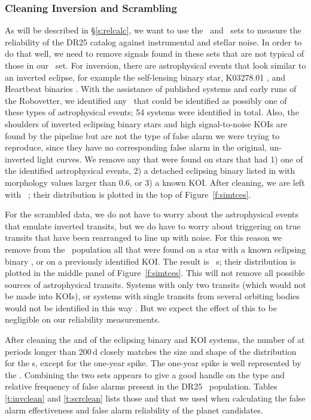 \subsubsection{Cleaning Inversion and Scrambling}
\label{s:clean}
As will be described in \S\ref{s:relcalc}, we want to use the \invtce\ and \scrtce\ sets to measure the reliability of the DR25 catalog against instrumental and stellar noise. In order to do that well, we need to remove signals found in these sets that are not typical of those in our \opstce\ set. For inversion, there are astrophysical events that look similar to an inverted eclipse, for example the self-lensing binary star, K03278.01 \citep{Kruse2014}, and Heartbeat binaries \citep{Thompson2012}. With the assistance of published systems and early runs of the Robovetter, we identified any \invtce\ that could be identified as possibly one of these types of astrophysical events; 54 systems were identified in total. Also, the shoulders of inverted eclipsing binary stars and high signal-to-noise KOIs are found by the pipeline but are not the type of false alarm we were trying to reproduce, since they have no corresponding false alarm in the original, un-inverted light curves. We remove any  that were found on stars that had 1) one of the identified astrophysical events, 2) a detached eclipsing binary listed in \citet{Kirk2016} with morphology values larger than 0.6, or 3) a known KOI.  After cleaning, we are left with \ninvtces\ ; their distribution is plotted in the top of Figure~\ref{f:simtces}.

For the scrambled data, we do not have to worry about the astrophysical events that emulate inverted transits, but we do have to worry about triggering on true transits that have been rearranged to line up with noise. For this reason we remove from the \scrtce\ population all that were found on a star with a known eclipsing binary \citep{Kirk2016}, or on a previously identified KOI.  The result is \nscrtces\ \scrtce s; their distribution is plotted in the middle panel of Figure~\ref{f:simtces}. This will not remove all possible sources of astrophysical transits. Systems with only two transits (which would not be made into KOIs), or systems with single transits from several orbiting bodies would not be identified in this way \citep[e.g., KIC~3542116, a star with possible exocomets, is a \scrtce\ dispositioned as an FP][]{Rappaport2017}. But we expect the effect of this to be negligible on our reliability measurements.

After cleaning the  and  of the eclipsing binary and KOI systems, the number of  at periods longer than 200\,d closely matches the size and shape of the distribution for the \opstce s, except for the one-year spike. The one-year spike is well represented by the .  Combining the two sets appears to give a good handle on the type and relative frequency of false alarms present in the DR25 \opstce\ population. Tables\,\ref{t:invclean} and \ref{t:scrclean} lists those  and  that we used when calculating the false alarm effectiveness and false alarm reliability of the planet candidates.




